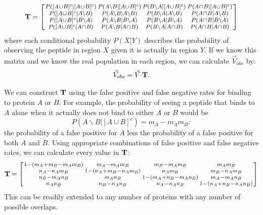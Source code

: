 \small\[
\footnotesize
\setlength{\arraycolsep}{1.0pt}
\medmuskip = 1mu %
{\bf T}=\left[\begin{array}{cccc}
P([A\cup B]^{c}|[A\cup B]^{c}) & P(A\backslash B|[A\cup B]^{c}) & P(B\backslash A|[A\cup B]^{c}) & P(A\cap B|[A\cup B]^{c})\\
P([A\cup B]^{c}|A\backslash B) & P(A\backslash B|A\backslash B) & P(B\backslash A|A\backslash B) & P(A\cap B|A\backslash B)\\
P([A\cup B]^{c}|B\backslash A) & P(A\backslash B|B\backslash A) & P(B\backslash A|B\backslash A) & P(A\cap B|B\backslash A)\\
P([A\cup B]^{c}|A\cap B) & P(A\backslash B|A\cap B) & P(B\backslash A|A\cap B) & P(A\cap B|A\cap B)
\end{array}\right]
\]
where each conditional probability $P(X|Y)$ describes the probability
of observing the peptide in region $X$ given it is actually in region
$Y$. If we know this matrix and we know the real population in each
region, we can calculate $\vec{V}_{obs}$ by: 
\[
\vec{V}_{obs}=\vec{V}{\bf \cdot T}.
\]

We can construct ${\bf T}$ using the false positive and false negative
rates for binding to protein $A$ or $B$. For example, the probability
of seeing a peptide that binds to $A$ alone when it actually does
not bind to either $A$ or $B$ would be
\[
P(A\backslash B|[A\cup B]^{c})=m_{A}-m_{A}m_{B}:
\]
the probability of a false positive for $A$ less the probability
of a false positive for both $A$ and $B$. Using appropriate combinations
of false positive and false negative rates, we can calculate every
value in ${\bf T}$:
\small\[
\footnotesize
\setlength{\arraycolsep}{1.0pt}
\medmuskip = 1mu %
{\bf T}=\left[\begin{array}{cccc}
1-(m_{A}+m_{B}-m_{A}m_{B}) & m_{A}-m_{A}m_{B} & m_{B}-m_{A}m_{B} & m_{A}m_{B}\\
n_{A}-n_{A}m_{B} & 1-(n_{A}+m_{B}-n_{A}m_{B}) & n_{A}m_{B} & m_{B}-n_{A}m_{B}\\
n_{B}-m_{A}n_{B} & m_{A}n_{B} & 1-(m_{A}+n_{B}-m_{A}n_{B}) & m_{A}-m_{A}n_{B}\\
n_{A}n_{B} & n_{B}-n_{A}n_{B} & n_{A}-n_{A}n_{B} & 1-(n_{A}+n_{B}-n_{A}n_{B})
\end{array}\right]
\]
This can be readily extended to any number of proteins with any number
of possible overlaps. 

